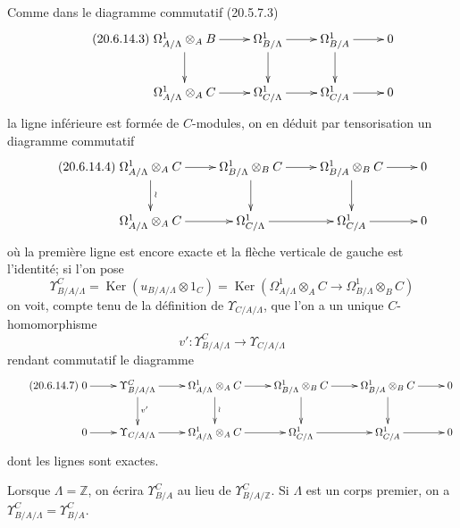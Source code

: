\begin{env}[20.6.14]
Comme dans le diagramme commutatif (20.5.7.3)
\begin{equation}
\tag{20.6.14.3}
\label{0.20.6.14.3-fr}
\xymatrix{
  \Omega^1_{A/\Lambda}\otimes_A B \ar[r] \ar[d] &
  \Omega^1_{B/\Lambda} \ar[r] \ar[d] &
  \Omega^1_{B/A} \ar[r] \ar[d] & 0 \\
  \Omega^1_{A/\Lambda}\otimes_A C \ar[r] &
  \Omega^1_{C/\Lambda} \ar[r] & \Omega^1_{C/A} \ar[r] & 0
}
\end{equation}
la ligne inférieure est formée de $C$-modules, on en déduit par
tensorisation un diagramme commutatif
\begin{equation}
\tag{20.6.14.4}
\label{0.20.6.14.4-fr}
\xymatrix{
  \Omega^1_{A/\Lambda}\otimes_A C \ar[r] \ar[d]^{\wr} &
  \Omega^1_{B/\Lambda}\otimes_B C \ar[r] \ar[d] &
  \Omega^1_{B/A}\otimes_B C \ar[r] \ar[d] & 0 \\
  \Omega^1_{A/\Lambda}\otimes_A C \ar[r] &
  \Omega^1_{C/\Lambda} \ar[r] & \Omega^1_{C/A} \ar[r] & 0
}
\end{equation}
où la première ligne est encore exacte et la flèche verticale de gauche
est l'identité; si l'on pose
\begin{equation}
\tag{20.6.14.5}
\label{0.20.6.14.5-fr}
  \Upsilon^C_{B/A/\Lambda}=
  \operatorname{Ker}(u_{B/A/\Lambda}\otimes1_C)=
  \operatorname{Ker}(\Omega^1_{A/\Lambda}\otimes_A C\longrightarrow
       \Omega^1_{B/\Lambda}\otimes_B C)
\end{equation}
on voit, compte tenu de la définition de $\Upsilon_{C/A/\Lambda}$, que
l'on a un unique $C$-homomorphisme
\begin{equation}
\tag{20.6.14.6}
\label{0.20.6.14.6-fr}
  v':\Upsilon^C_{B/A/\Lambda}\longrightarrow\Upsilon_{C/A/\Lambda}
\end{equation}
rendant commutatif le diagramme
\begin{equation}
\tag{20.6.14.7}
\label{0.20.6.14.7-fr}
\xymatrix{
  0 \ar[r] & \Upsilon^C_{B/A/\Lambda} \ar[r] \ar[d]^{v'} &
  \Omega^1_{A/\Lambda}\otimes_A C \ar[r] \ar[d]^{\wr} &
  \Omega^1_{B/\Lambda}\otimes_B C \ar[r] \ar[d] &
  \Omega^1_{B/A}\otimes_B C \ar[r] \ar[d] & 0 \\
  0 \ar[r] & \Upsilon_{C/A/\Lambda} \ar[r] &
  \Omega^1_{A/\Lambda}\otimes_A C \ar[r] &
  \Omega^1_{C/\Lambda} \ar[r] & \Omega^1_{C/A} \ar[r] & 0
}
\end{equation}
dont les lignes sont exactes.

Lorsque $\Lambda=\mathbb{Z}$, on écrira $\Upsilon^C_{B/A}$ au lieu de
$\Upsilon^C_{B/A/\mathbb{Z}}$. Si $\Lambda$ est un corps premier, on a
$\Upsilon^C_{B/A/\Lambda}=\Upsilon^C_{B/A}$.
\end{env}

